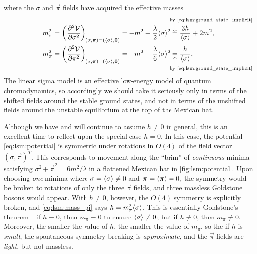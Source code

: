 where the $\sigma$ and $\vec\pi$ fields have acquired the effective masses
\begin{subequations}
\begin{align}
	m_\sigma^2 &= \pdv[2]{\pot}{\sigma}_{(\sigma,\vec\pi)=(\avg{\sigma},\vec{0})} = -m^2 + \frac{\lambda}{2} \avg{\sigma}^2 \equalexplabove{\text{by \eqref{eq:lsm:ground_state_implicit}}} \frac{3h}{\avg{\sigma}} + 2 m^2 , \label{eq:lsm:mass_sigma} \\
	m_\pi^2    &= \pdv[2]{\pot}{\pi   }_{(\sigma,\vec\pi)=(\avg{\sigma},\vec{0})} = -m^2 + \frac{\lambda}{6} \avg{\sigma}^2 \equalexplbelow{\text{by \eqref{eq:lsm:ground_state_implicit}}} \frac{h}{\avg{\sigma}} , \label{eq:lsm:mass_pi}
\end{align}
\end{subequations}
The linear sigma model is an effective low-energy model of quantum chromodynamics, so accordingly we should take it seriously only in terms of the shifted fields around the stable ground states, and not in terms of the unshifted fields around the unstable equilibrium at the top of the Mexican hat.

Although we have and will continue to assume $h \neq 0$ in general, this is an excellent time to reflect upon the special case $h = 0$.
In this case, the potential \eqref{eq:lsm:potential} is symmetric under rotations in $O(4)$ of the field vector $(\sigma, \vec\pi)^T$.
This corresponds to movement along the ``brim'' of \emph{continuous} minima satisfying $\sigma^2 + \vec\pi^2 = 6 m^2 / \lambda$ in a flattened Mexican hat in \cref{fig:lsm:potential}.
Upon choosing \emph{one} minima where $\sigma = \langle \sigma \rangle \neq 0$ and ${\bm{\pi}} = \langle {\bm{\pi}} \rangle = 0$, the symmetry would be broken to rotations of only the three $\vec\pi$ fields, and three massless Goldstone bosons would appear.
With $h \neq 0$, however, the $O(4)$ symmetry is explicitly broken, and \cref{eq:lsm:mass_pi} says $h = m_\pi^2 \langle \sigma \rangle$.
This is essentially Goldstone's theorem -- if $h = 0$, then $m_\pi = 0$ to ensure $\langle \sigma \rangle \neq 0$; but if $h \neq 0$, then $m_\pi \neq 0$.
Moreover, the smaller the value of $h$, the smaller the value of $m_\pi$, so the if $h$ is \emph{small}, the spontaneous symmetry breaking is \emph{approximate}, and the $\vec\pi$ fields are \emph{light}, but not massless.

